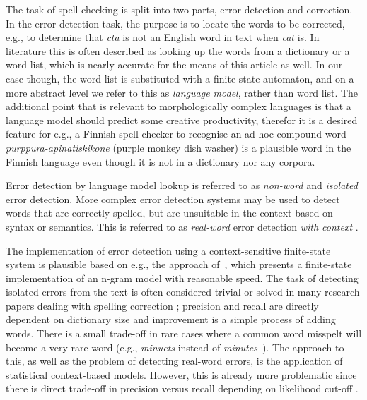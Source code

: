 \documentclass[a4paper,12pt]{article}
\begin{document}
The task of spell-checking is split into two parts, error detection and
correction. In the error detection task, the purpose is to locate the words to
be corrected, e.g., to determine that \emph{cta} is not an English word in text
when \emph{cat} is. In literature this is often described as looking up the
words from a dictionary or a word list, which is nearly accurate for the means
of this article as well. In our case though, the word list is substituted with
a finite-state automaton, and on a more abstract level we refer to this as
\emph{language model}, rather than word list. The additional point that is
relevant to morphologically complex languages is that a language model should
predict some creative productivity, therefor it is a desired feature for e.g.,
a Finnish spell-checker to recognise an ad-hoc compound word
\emph{purppura-apinatiskikone} (purple monkey dish washer) is a plausible word
in the Finnish language even though it is not in a dictionary nor any corpora.

Error detection by language model lookup is referred to as \emph{non-word} and
\emph{isolated} error detection. More complex error detection systems may be
used to detect words that are correctly spelled, but are unsuitable in the
context based on syntax or semantics. This is referred to as \emph{real-word}
error detection \emph{with context} \cite[]{mays/1991}.

The implementation of error detection using a context-sensitive finite-state
system is plausible based on e.g., the approach of~\cite{silfverberg/2010},
which presents a finite-state implementation of an n-gram model with reasonable
speed. The task of detecting isolated errors from the text is often considered
trivial or solved in many research papers dealing with spelling correction
\cite[e.g.][]{otero/2007}; precision and recall are directly dependent on
dictionary size and improvement is a simple process of adding words.  There is
a small trade-off in rare cases where a common word misspelt will become a very
rare word (e.g., \emph{minuets} instead of
\emph{minutes}~\cite[]{kukich1992techniques}). The approach to this, as well as
the problem of detecting real-word errors, is the application of statistical
context-based models.  However, this is already more problematic since there is
direct trade-off in precision versus recall depending on likelihood cut-off
\cite[]{hirst2008evaluation,wilcoxohearn2008realword}.
\end{document}
